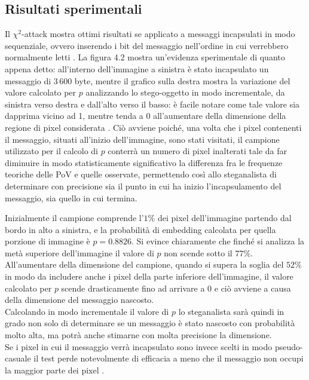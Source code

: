 \subsection{Risultati sperimentali}
Il $\chi^2$-attack mostra ottimi risultati se applicato a messaggi incapsulati in modo sequenziale, ovvero inserendo i bit del messaggio nell'ordine in cui verrebbero normalmente letti \cite{chisq}. La figura 4.2 mostra un'evidenza sperimentale di quanto appena detto: all'interno dell'immagine a sinistra è stato incapsulato un messaggio di $3 \,600$ byte, mentre il grafico sulla destra mostra la variazione del valore calcolato per $p$ analizzando lo stego-oggetto in modo incrementale, da sinistra verso destra e dall'alto verso il basso: è facile notare come tale valore sia dapprima vicino ad 1, mentre tenda a 0 all'aumentare della dimensione della regione di pixel considerata \cite{chisq}. Ciò avviene poiché, una volta che i pixel contenenti il messaggio, situati all'inizio dell'immagine, sono stati visitati, il campione utilizzato per il calcolo di $p$ conterrà un numero di pixel inalterati tale da far diminuire in modo statisticamente significativo la differenza fra le frequenze teoriche delle PoV e quelle osservate, permettendo così allo steganalista di determinare con precisione sia il punto in cui ha inizio l'incapsulamento del messaggio, sia quello in cui termina.

Inizialmente il campione comprende l'$1\%$ dei pixel dell'immagine partendo dal bordo in alto a sinistra, e la probabilità di embedding calcolata per quella porzione di immagine è $p = 0.8826$. Si evince chiaramente che finché si analizza la metà superiore dell'immagine il valore di $p$ non scende sotto il $77\%$. All'aumentare della dimensione del campione, quando si supera la soglia del $52\%$ in modo da includere anche i pixel della parte inferiore dell'immagine, il valore calcolato per $p$ scende drasticamente fino ad arrivare a $0$ e ciò avviene a causa della dimensione del messaggio nascosto.\\Calcolando in modo incrementale il valore di $p$ lo steganalista sarà quindi in grado non solo di determinare se un messaggio è stato nascosto con probabilità molto alta, ma potrà anche stimarne con molta precisione la dimensione.\\Se i pixel in cui il messaggio verrà incapsulato sono invece scelti in modo pseudo-casuale il test perde notevolmente di efficacia a meno che il messaggio non occupi la maggior parte dei pixel \cite{fried1}.
